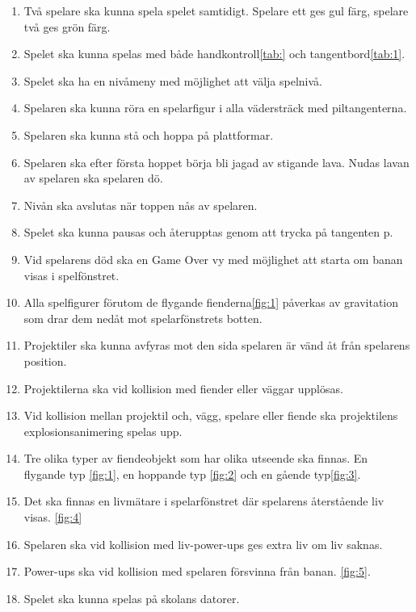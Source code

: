 \documentclass{TDP005mall}
\begin{document}
\begin{enumerate}
\item Två spelare ska kunna spela spelet samtidigt. Spelare ett ges gul färg, spelare två ges grön färg.
\item Spelet ska kunna spelas med både handkontroll\ref{tab:} och tangentbord\ref{tab:1}. 
\item Spelet ska ha en nivåmeny med möjlighet att välja spelnivå.
\item Spelaren ska kunna röra en spelarfigur i alla vädersträck med piltangenterna.
\item Spelaren ska kunna stå och hoppa på plattformar.
\item Spelaren ska efter första hoppet börja bli jagad av stigande lava. Nudas lavan av spelaren ska spelaren dö.
\item Nivån ska avslutas när toppen nås av spelaren.
\item Spelet ska kunna pausas och återupptas genom att trycka på tangenten p.
\item Vid spelarens död ska en Game Over vy med möjlighet att starta om banan visas i spelfönstret.
\item Alla spelfigurer förutom de flygande fienderna\ref{fig:1} påverkas av gravitation som drar dem nedåt mot spelarfönstrets botten.
\item Projektiler ska kunna avfyras mot den sida spelaren är vänd åt från spelarens position.
\item Projektilerna ska vid kollision med fiender eller väggar upplösas.
\item Vid kollision mellan projektil och, vägg, spelare eller fiende ska projektilens explosionsanimering spelas upp.
\item Tre olika typer av fiendeobjekt som har olika utseende ska finnas. En flygande typ \ref{fig:1}, en hoppande typ \ref{fig:2} och en gående typ\ref{fig:3}.
\item Det ska finnas en livmätare i spelarfönstret där spelarens återstående liv visas. \ref{fig:4}
\item Spelaren ska vid kollision med liv-power-ups ges extra liv om liv saknas.
\item Power-ups ska vid kollision med spelaren försvinna från banan. \ref{fig:5}.
\item Spelet ska kunna spelas på skolans datorer.
\end{enumerate}
\end{document}
